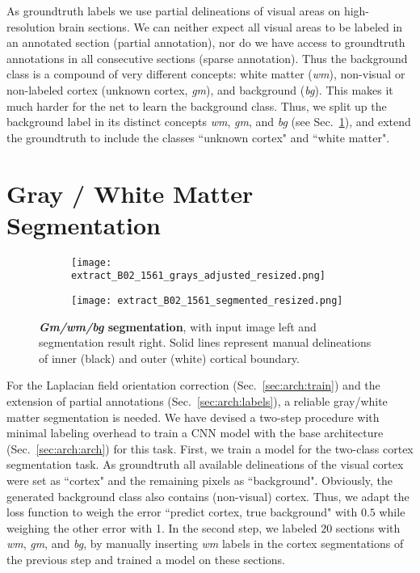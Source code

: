 \documentclass{article}
\begin{document}
As groundtruth labels we use partial delineations of visual areas on high-resolution brain sections.
We can neither expect all visual areas to be labeled in an annotated section (partial annotation), nor do we have access to groundtruth annotations in all consecutive sections (sparse annotation).
Thus the background class is a compound of very different concepts: white matter (\emph{wm}), non-visual or non-labeled cortex (unknown cortex, \emph{gm}), and background (\emph{bg}).
This makes it much harder for the net to learn the background class.
Thus, we split up the background label in its distinct concepts \emph{wm}, \emph{gm}, and \emph{bg} (see Sec.~\ref{sec:seg}), and extend the groundtruth to include the classes ``unknown cortex" and ``white matter".

\section{Gray / White Matter Segmentation}
\label{sec:seg}

\begin{figure} %
		\centering
		\begin{subfigure}[t]{.38\linewidth}
			\centering
			\texttt{[image: extract\_B02\_1561\_grays\_adjusted\_resized.png]}
		\end{subfigure}%
		\begin{subfigure}[t]{.38\linewidth}
			\centering
			\texttt{[image: extract\_B02\_1561\_segmented\_resized.png]}
		\end{subfigure}
		\caption{
			\textbf{\emph{Gm/wm/bg} segmentation}, with input image left and segmentation result right.
			Solid lines represent manual delineations of inner (black) and outer (white) cortical boundary.
		}
		\label{fig:bgseg}
\end{figure}

For the Laplacian field orientation correction (Sec.~\ref{sec:arch:train}) and the extension of partial annotations (Sec.~\ref{sec:arch:labels}), a reliable gray/white matter segmentation is needed.
We have devised a two-step procedure with minimal labeling overhead to train a CNN model with the base architecture (Sec.~\ref{sec:arch:arch}) for this task.
First, we train a model for the two-class cortex segmentation task.
As groundtruth all available delineations of the visual cortex were set as ``cortex" and the remaining pixels as ``background".
Obviously, the generated background class also contains (non-visual) cortex.
Thus, we adapt the loss function to weigh the error ``predict cortex, true background" with $0.5$ while weighing the other error with 1.
In the second step, we labeled $20$ sections with \emph{wm}, \emph{gm}, and \emph{bg}, by manually inserting \emph{wm} labels in the cortex segmentations of the previous step and trained a model on these sections. %
\end{document}

